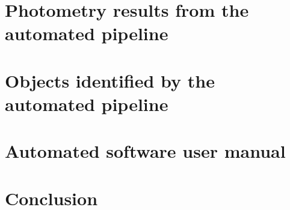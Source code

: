 \documentclass[11pt,a4paper]{report}      %
\begin{document}
\chapter{Photometry results from the automated pipeline}\label{chap:results}


\chapter{Objects identified by the automated pipeline}\label{chap:highlights}


\chapter{Automated software user manual}\label{chap:usermanual}


\chapter{Conclusion}



%  
%  




\end{document}
